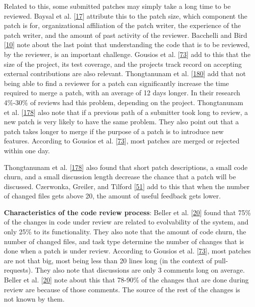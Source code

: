 \documentclass[]{book}
\begin{document}
Related to this, some submitted patches may simply take a long time to
be reviewed. Baysal et al.
{[}\protect\hyperlink{ref-baysal2016investigating}{17}{]} attribute this
to the patch size, which component the patch is for, organizational
affiliation of the patch writer, the experience of the patch writer, and
the amount of past activity of the reviewer. Bacchelli and Bird
{[}\protect\hyperlink{ref-bacchelli2013expectations}{10}{]} note about
the last point that understanding the code that is to be reviewed, by
the reviewer, is an important challenge. Gousios et al.
{[}\protect\hyperlink{ref-gousios2014exploratory}{73}{]} add to this
that the size of the project, its test coverage, and the projects track
record on accepting external contributions are also relevant.
Thongtanunam et al.
{[}\protect\hyperlink{ref-thongtanunam2015should}{180}{]} add that not
being able to find a reviewer for a patch can significantly increase the
time required to merge a patch, with an average of 12 days longer. In
their research 4\%-30\% of reviews had this problem, depending on the
project. Thongtanunam et al.
{[}\protect\hyperlink{ref-thongtanunam2017review}{178}{]} also note that
if a previous path of a submitter took long to review, a new patch is
very likely to have the same problem. They also point out that a patch
takes longer to merge if the purpose of a patch is to introduce new
features. According to Gousios et al.
{[}\protect\hyperlink{ref-gousios2014exploratory}{73}{]}, most patches
are merged or rejected within one day.

Thongtanunam et al.
{[}\protect\hyperlink{ref-thongtanunam2017review}{178}{]} also found
that short patch descriptions, a small code churn, and a small
discussion length decrease the chance that a patch will be discussed.
Czerwonka, Greiler, and Tilford
{[}\protect\hyperlink{ref-czerwonka2015code}{51}{]} add to this that
when the number of changed files gets above 20, the amount of useful
feedback gets lower.

\textbf{Characteristics of the code review process}: Beller et al.
{[}\protect\hyperlink{ref-beller2014modern}{20}{]} found that 75\% of
the changes in code under review are related to evolvability of the
system, and only 25\% to its functionality. They also note that the
amount of code churn, the number of changed files, and task type
determine the number of changes that is done when a patch is under
review. According to Gousios et al.
{[}\protect\hyperlink{ref-gousios2014exploratory}{73}{]}, most patches
are not that big, most being less than 20 lines long (in the context of
pull-requests). They also note that discussions are only 3 comments long
on average. Beller et al.
{[}\protect\hyperlink{ref-beller2014modern}{20}{]} note about this that
78-90\% of the changes that are done during review are because of those
comments. The source of the rest of the changes is not known by them.
\end{document}
